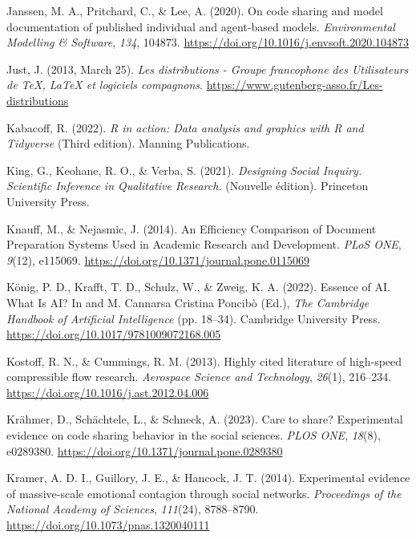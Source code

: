 \documentclass[
  letterpaper,
  DIV=11,
  numbers=noendperiod]{scrreprt}
\newlength{\cslhangindent}
\newenvironment{CSLReferences}[2] %
 {\begin{list}{}{%
  \setlength{\itemindent}{0pt}
  \setlength{\leftmargin}{0pt}
  \setlength{\parsep}{0pt}
  \ifodd #1
   \setlength{\leftmargin}{\cslhangindent}
   \setlength{\itemindent}{-1\cslhangindent}
  \fi
  \setlength{\itemsep}{#2\baselineskip}}}
 {\end{list}}
\begin{document}
\begin{CSLReferences}{1}{0}
Janssen, M. A., Pritchard, C., \& Lee, A. (2020). On code sharing and
model documentation of published individual and agent-based models.
\emph{Environmental Modelling \& Software}, \emph{134}, 104873.
\url{https://doi.org/10.1016/j.envsoft.2020.104873}

Just, J. (2013, March 25). \emph{Les distributions - {Groupe}
francophone des {Utilisateurs} de {TeX}, {LaTeX} et logiciels
compagnons}. \url{https://www.gutenberg-asso.fr/Les-distributions}

Kabacoff, R. (2022). \emph{R in action: Data analysis and graphics with
{R} and {Tidyverse}} (Third edition). Manning Publications.

King, G., Keohane, R. O., \& Verba, S. (2021). \emph{Designing {Social
Inquiry}. {Scientific Inference} in {Qualitative Research}.} (Nouvelle
édition). Princeton University Press.

Knauff, M., \& Nejasmic, J. (2014). An {Efficiency Comparison} of
{Document Preparation Systems Used} in {Academic Research} and
{Development}. \emph{PLoS ONE}, \emph{9}(12), e115069.
\url{https://doi.org/10.1371/journal.pone.0115069}

König, P. D., Krafft, T. D., Schulz, W., \& Zweig, K. A. (2022). Essence
of {AI}. {What Is AI}? In and M. Cannarsa Cristina Poncibò (Ed.),
\emph{The {Cambridge Handbook} of {Artificial Intelligence}} (pp.
18--34). Cambridge University Press.
\url{https://doi.org/10.1017/9781009072168.005}

Kostoff, R. N., \& Cummings, R. M. (2013). Highly cited literature of
high-speed compressible flow research. \emph{Aerospace Science and
Technology}, \emph{26}(1), 216--234.
\url{https://doi.org/10.1016/j.ast.2012.04.006}

Krähmer, D., Schächtele, L., \& Schneck, A. (2023). Care to share?
{Experimental} evidence on code sharing behavior in the social sciences.
\emph{PLOS ONE}, \emph{18}(8), e0289380.
\url{https://doi.org/10.1371/journal.pone.0289380}

Kramer, A. D. I., Guillory, J. E., \& Hancock, J. T. (2014).
Experimental evidence of massive-scale emotional contagion through
social networks. \emph{Proceedings of the National Academy of Sciences},
\emph{111}(24), 8788--8790.
\url{https://doi.org/10.1073/pnas.1320040111}


\end{CSLReferences}
\end{document}
